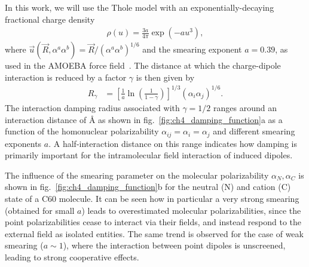In this work, we will use the Thole model with an exponentially-decaying fractional charge density
\begin{align}
 \rho(u) = \frac{3a}{4\pi} \exp(-au^3),
\end{align}
where $\vec{u}(\vec{R},\alpha^a \alpha^b) = \vec{R} / (\alpha^a \alpha^b)^{1/6}$ and the smearing exponent $a=0.39$, as used in the AMOEBA force field~\cite{ren_polarizable_2003}. The distance at which the charge-dipole interaction is reduced by a factor $\gamma$ is then given by
\begin{align}
 R_\gamma & = \left[ \frac{1}{a} \ln\left(\frac{1}{1-\gamma}\right) \right]^{1/3} (\alpha_i\alpha_j)^{1/6}.
 \label{equ:screening_radius}
\end{align}
The interaction damping radius associated with $\gamma=1/2$ ranges around an interaction distance of \unit[2]{\AA} as shown in fig.~\ref{fig:ch4_damping_function}a as a function of the homonuclear polarizability $\alpha_{ij} = \alpha_i = \alpha_j$ and different smearing exponents $a$. A half-interaction distance on this range indicates how damping is primarily important for the intramolecular field interaction of induced dipoles. 


The influence of the smearing parameter on the molecular polarizability $\alpha_N, \alpha_C$ is shown in fig.~\ref{fig:ch4_damping_function}b for the neutral (N) and cation (C) state of a C60 molecule. It can be seen how in particular a very strong smearing (obtained for small $a$) leads to overestimated molecular polarizabilities, since the point polarizabilities cease to interact via their fields, and instead respond to the external field as isolated entities. The same trend is observed for the case of weak smearing ($a\sim 1$), where the interaction between point dipoles is unscreened, leading to strong cooperative effects.

